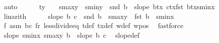 \begin{isabellebody}
\ auto\isanewline
\ \ \ \ \isamarkupfalse%
\ {\isachardoublequoteopen}ty\ {\isacharplus}{\kern0pt}\ {}\ {\isachargreater}{\kern0pt}\ s{}{\isacharunderscore}{\kern0pt}maxy\ {\isacharplus}{\kern0pt}\ s{}{\isacharunderscore}{\kern0pt}miny\ {\isacharminus}{\kern0pt}\ snd\ b{}\ {\isacharplus}{\kern0pt}\ {\isacharparenleft}{\kern0pt}slope\ {\isacharparenleft}{\kern0pt}b{}{\isacharplus}{\kern0pt}{\isacharparenleft}{\kern0pt}tx{\isacharcomma}{\kern0pt}{}{\isacharparenright}{\kern0pt}{\isacharparenright}{\kern0pt}\ {\isacharparenleft}{\kern0pt}c{}{\isacharplus}{\kern0pt}{\isacharparenleft}{\kern0pt}tx{\isacharcomma}{\kern0pt}{}{\isacharparenright}{\kern0pt}{\isacharparenright}{\kern0pt}{\isacharparenright}{\kern0pt}{\isacharasterisk}{\kern0pt}{\isacharparenleft}{\kern0pt}fst\ b{}{\isacharplus}{\kern0pt}tx{\isacharminus}{\kern0pt}s{}{\isacharunderscore}{\kern0pt}minx{\isacharparenright}{\kern0pt}{\isachardoublequoteclose}\isanewline
\ \ \ \ \ \ \isamarkupfalse%
\ linarith\isanewline
\ \ \ \ \isamarkupfalse%
\ {\isachardoublequoteopen}slope\ b\ c\ {\isacharless}{\kern0pt}\ {\isacharparenleft}{\kern0pt}snd\ b\ {\isacharminus}{\kern0pt}\ s{}{\isacharunderscore}{\kern0pt}maxy{\isacharparenright}{\kern0pt}\ {\isacharslash}{\kern0pt}\ {\isacharparenleft}{\kern0pt}fst\ b\ {\isacharminus}{\kern0pt}\ s{}{\isacharunderscore}{\kern0pt}minx{\isacharparenright}{\kern0pt}{\isachardoublequoteclose}\ \isanewline
\ \ \ \ \ \ \isamarkupfalse%
\ f{}\ asm{\isacharparenleft}{\kern0pt}{}{\isacharparenright}{\kern0pt}\ b{}c{}{\isacharparenleft}{\kern0pt}{}{\isacharparenright}{\kern0pt}\ f{}r{}\ less{\isacharunderscore}{\kern0pt}divide{\isacharunderscore}{\kern0pt}eq\ t{\isacharunderscore}{\kern0pt}def\ tx{\isacharunderscore}{\kern0pt}def\ w{}{\isacharunderscore}{\kern0pt}def\ w{}{\isacharunderscore}{\kern0pt}pos\ \isamarkupfalse%
\ fastforce\isanewline
\ \ \ \ \isamarkupfalse%
\ {\isachardoublequoteopen}slope\ {\isacharparenleft}{\kern0pt}s{}{\isacharunderscore}{\kern0pt}minx{\isacharcomma}{\kern0pt}\ s{}{\isacharunderscore}{\kern0pt}maxy{\isacharparenright}{\kern0pt}\ b\ {\isachargreater}{\kern0pt}\ slope\ b\ c{\isachardoublequoteclose}\ \isamarkupfalse%
\ slope{\isacharunderscore}{\kern0pt}def\ \isamarkupfalse%

\end{isabellebody}
